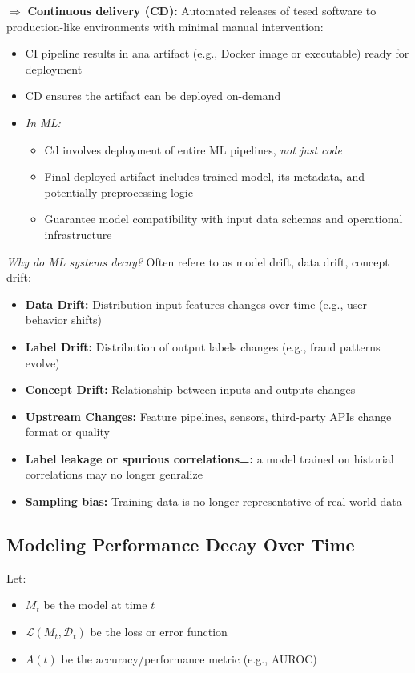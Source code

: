 \documentclass[../Main.tex]{subfiles}
\begin{document}
$\Rightarrow$ \textbf{Continuous delivery (CD):} Automated releases of tesed software to production-like environments with minimal manual intervention:
\begin{itemize}
    \item CI pipeline results in ana artifact (e.g., Docker image or executable) ready for deployment
    \item CD ensures the artifact can be deployed on-demand
    \item \textit{In ML:}
    \begin{itemize}
        \item Cd involves deployment of entire ML pipelines, \textit{not just code}
        \item Final deployed artifact includes trained model, its metadata, and potentially preprocessing logic
        \item Guarantee model compatibility with input data schemas and operational infrastructure
    \end{itemize}
\end{itemize}


\textit{Why do ML systems decay?} Often refere to as model drift, data drift, concept drift:
\begin{itemize}
    \item \textbf{Data Drift:} Distribution input features changes over time (e.g., user behavior shifts)
    \item \textbf{Label Drift:} Distribution of output labels changes (e.g., fraud patterns evolve)
    \item \textbf{Concept Drift:} Relationship between inputs and outputs changes
    \item \textbf{Upstream Changes:}  Feature pipelines, sensors, third-party APIs change format or quality
    \item \textbf{Label leakage or spurious correlations=:} a model trained on historial correlations may no longer genralize
    \item \textbf{Sampling bias:} Training data is no longer representative of real-world data
\end{itemize}

\subsection*{Modeling Performance Decay Over Time}

Let:
\begin{itemize}
    \item $M_t$ be the model at time $t$
    \item $\mathcal{L}(M_t, \mathcal{D}_t)$ be the loss or error function
    \item $A(t)$ be the accuracy/performance metric (e.g., AUROC)
\end{itemize}
\end{document}
